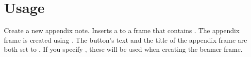 \documentclass{l3doc}
\begin{document}


\section{Usage}

\begin{function}{\appxnote}
  \begin{syntax}
  \end{syntax}
  
  Create a new appendix note.  Inserts a  to a frame that contains .  The appendix frame is created using .  The button’s text and the title of the appendix frame are both set to .  If you specify , these will be used when creating the beamer frame.
\end{function}
\end{document}
